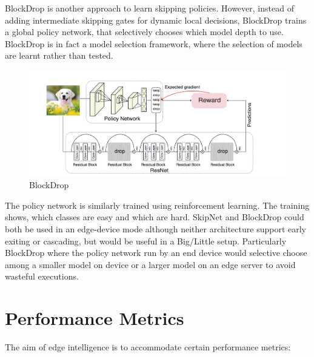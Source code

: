 BlockDrop \cite{wu_blockdrop:_2017} is another approach to learn skipping policies. However, instead of adding intermediate skipping gates for dynamic local decisions, BlockDrop trains a global policy network, that selectively chooses which model depth to use. BlockDrop is in fact a model selection framework, where the selection of models are learnt rather than tested. 

\begin{figure}
	\centering
	\includegraphics[width=\linewidth]{figures/models/blockdrop}
	\caption[BlockDrop]{BlockDrop}
\end{figure}

The policy network is similarly trained using reinforcement learning. The training shows, which classes are easy and which are hard. SkipNet and BlockDrop could both be used in an edge-device mode although neither architecture support early exiting or cascading, but would be useful in a Big/Little \cite{park_big/little_2015} setup. Particularly BlockDrop where the policy network run by an end device would selective choose among a smaller model on device or a larger model on an edge server to avoid wasteful executions.

\section{Performance Metrics}

The aim of edge intelligence is to accommodate certain performance metrics:

